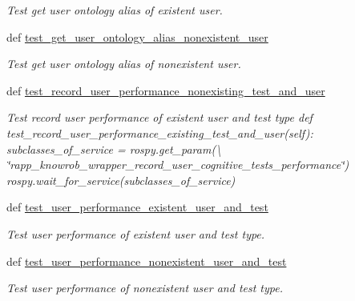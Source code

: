 \begin{DoxyCompactItemize}
\begin{DoxyCompactList}\small\item\em Test get user ontology alias of existent user. \end{DoxyCompactList}\item 
def \hyperlink{classcognitive__exercise__system__knowrob__services__functional__tests_1_1OntologyFunc_af2dd09a1ea405c586906a8db0b4de689}{test\-\_\-get\-\_\-user\-\_\-ontology\-\_\-alias\-\_\-nonexistent\-\_\-user}
\begin{DoxyCompactList}\small\item\em Test get user ontology alias of nonexistent user. \end{DoxyCompactList}\item 
def \hyperlink{classcognitive__exercise__system__knowrob__services__functional__tests_1_1OntologyFunc_ab2bcb296c17b73a1baa76c55ffdade52}{test\-\_\-record\-\_\-user\-\_\-performance\-\_\-nonexisting\-\_\-test\-\_\-and\-\_\-user}
\begin{DoxyCompactList}\small\item\em Test record user performance of existent user and test type def test\-\_\-record\-\_\-user\-\_\-performance\-\_\-existing\-\_\-test\-\_\-and\-\_\-user(self)\-: subclasses\-\_\-of\-\_\-service = rospy.\-get\-\_\-param(\textbackslash{} \char`\"{}rapp\-\_\-knowrob\-\_\-wrapper\-\_\-record\-\_\-user\-\_\-cognitive\-\_\-tests\-\_\-performance\char`\"{}) rospy.\-wait\-\_\-for\-\_\-service(subclasses\-\_\-of\-\_\-service) \end{DoxyCompactList}\item 
def \hyperlink{classcognitive__exercise__system__knowrob__services__functional__tests_1_1OntologyFunc_a7589b1b87bf171a7b19fb1620e689c4b}{test\-\_\-user\-\_\-performance\-\_\-existent\-\_\-user\-\_\-and\-\_\-test}
\begin{DoxyCompactList}\small\item\em Test user performance of existent user and test type. \end{DoxyCompactList}\item 
def \hyperlink{classcognitive__exercise__system__knowrob__services__functional__tests_1_1OntologyFunc_ad697dd9b6de9014f73d1deda76e17abf}{test\-\_\-user\-\_\-performance\-\_\-nonexistent\-\_\-user\-\_\-and\-\_\-test}
\begin{DoxyCompactList}\small\item\em Test user performance of nonexistent user and test type. \end{DoxyCompactList}\end{DoxyCompactItemize}


